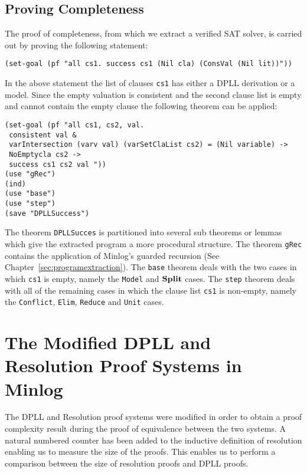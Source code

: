 \subsection*{Proving Completeness}
The proof of completeness, from which we extract a verified SAT solver, is carried out by proving the following statement:

\begin{center}
\texttt{(set-goal (pf "all cs1. success cs1 (Nil cla) (ConsVal (Nil lit))"))}
\end{center}

In the above statement the list of clauses \texttt{cs1} has either a DPLL derivation or a model. Since the empty valuation is consistent and the second clause list is empty and cannot contain the empty clause the following theorem can be applied:


\begin{lstlisting}[caption = "Beginning of the Completeness Proof"]
(set-goal (pf "all cs1, cs2, val.  
 consistent val & 
 varIntersection (varv val) (varSetClaList cs2) = (Nil variable) -> 
 NoEmptycla cs2 ->  
 success cs1 cs2 val "))
(use "gRec")
(ind)
(use "base")
(use "step")
(save "DPLLSuccess")
\end{lstlisting}

The theorem \texttt{DPLLSucces} is partitioned into several sub theorems or lemmas which give the extracted program a more procedural structure. The theorem \texttt{gRec} contains the application of Minlog's guarded recursion (See Chapter~\ref{sec:programextraction}).  The \texttt{base} theorem deals with the two cases in which \texttt{cs1} is empty, namely the \texttt{Model} and $\mathbf{Split}$ cases. The \texttt{step} theorem deals with all of the remaining cases in which the clause list \texttt{cs1} is non-empty, namely the \texttt{Conflict}, \texttt{Elim}, \texttt{Reduce} and \texttt{Unit} cases.


\section{The Modified DPLL and  Resolution Proof Systems in Minlog}
The DPLL and Resolution proof systems were modified in order to obtain a proof complexity result during the proof of equivalence between the two systems. A natural numbered counter has been added to the inductive definition of resolution enabling us to measure the size of the proofs. This enables us to perform a comparison between the size of resolution proofs and DPLL proofs.


